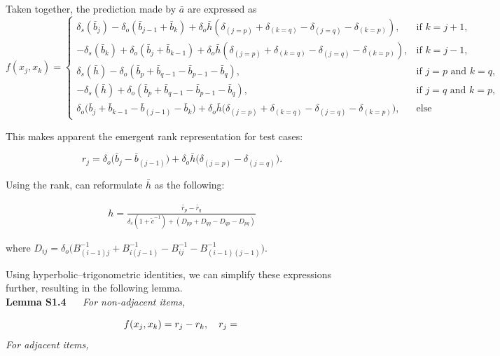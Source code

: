 \documentclass{article}
\theoremstyle{plain}
\begin{document}
Taken together, the prediction made by $\bar{a}$ are expressed as
\[
f(x_j, x_k) =
\begin{cases}
\delta_s(\bar{b}_j) - \delta_o(\bar{b}_{j-1} + \bar{b}_{k}) + \delta_o \bar{h}(\delta_{(j=p)} + \delta_{(k=q)} - \delta_{(j=q)} - \delta_{(k=p)}), & \text{if } k = j+1, \\[6pt]
- \delta_s(\bar{b}_k) + \delta_o(\bar{b}_{j} + \bar{b}_{k-1}) + \delta_o \bar{h}(\delta_{(j=p)} + \delta_{(k=q)} - \delta_{(j=q)} - \delta_{(k=p)}), & \text{if } k = j-1, \\[6pt]
\delta_s(\bar{h}) - \delta_o(\bar{b}_{p} + \bar{b}_{q-1} - \bar{b}_{p-1} - \bar{b}_{q}), & \text{if } j=p \text{ and } k=q, \\
- \delta_s(\bar{h}) + \delta_o(\bar{b}_{p} + \bar{b}_{q-1} - \bar{b}_{p-1} - \bar{b}_{q}), & \text{if } j=q \text{ and } k=p, \\
\delta_o \bigl(\bar{b}_j + \bar{b}_{k-1} - \bar{b}_{(j-1)} - \bar{b}_k\bigr) + \delta_o \bar{h} \bigl(\delta_{(j=p)} + \delta_{(k=q)} - \delta_{(j=q)} - \delta_{(k=p)}\bigr), & \text{else} 
\end{cases}
\]

This makes apparent the emergent rank representation for test cases:

\begin{equation}
r_j = \delta_o \bigl(\bar{b}_j - \bar{b}_{(j-1)} \bigr) + \delta_o \bar{h} \bigl(\delta_{(j=p)} - \delta_{(j=q)} \bigr).
\tag{S67}
\end{equation}

Using the rank, can reformulate $\bar{h}$ as the following:

\begin{align}
    h = \frac{ \tilde{r_p} - \tilde{r_q} }
    { \delta_s(1+\tilde{c}^{-1}) + (D_{pp} + D_{qq} - D_{qp} - D_{pq}) }
    \tag{S68}
\end{align}

    where $ D_{ij} = \delta_o \Big( B_{(i-1)j}^{-1} + B_{i(j-1)}^{-1} - B_{ij}^{-1} - B_{(i-1)(j-1)}^{-1} \Big) $.

Using hyperbolic–trigonometric identities, we can simplify these expressions
further, resulting in the following lemma. \\
\bigskip
\textbf{Lemma S1.4} $\quad$ \textit{For non-adjacent items,}

\begin{equation}
    f(x_j,x_k) = r_j - r_k, \quad r_j = \\
    \notag
\end{equation}
\textit{For adjacent items, }
\end{document}
